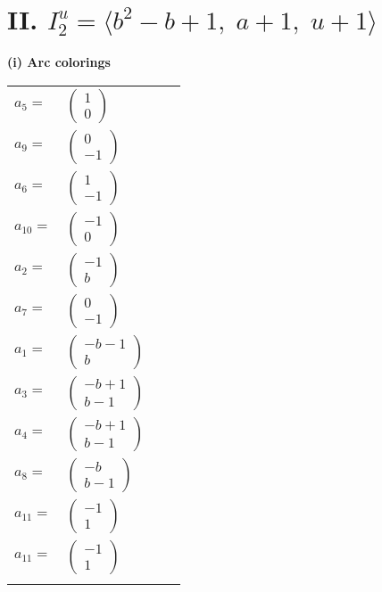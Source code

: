 \documentclass[1p]{elsarticle_modified}
\theoremstyle{definition}
\begin{document}
\centering \section*{II. $I^u_{2}= \langle b^2- b+1,\;a+1,\;u+1 \rangle$}
\flushleft \textbf{(i) Arc colorings}\\
\begin{tabular}{m{7pt} m{180pt} m{7pt} m{180pt} }
\flushright $a_{5}=$&$\begin{pmatrix}1\\0\end{pmatrix}$ \\
\flushright $a_{9}=$&$\begin{pmatrix}0\\-1\end{pmatrix}$ \\
\flushright $a_{6}=$&$\begin{pmatrix}1\\-1\end{pmatrix}$ \\
\flushright $a_{10}=$&$\begin{pmatrix}-1\\0\end{pmatrix}$ \\
\flushright $a_{2}=$&$\begin{pmatrix}-1\\b\end{pmatrix}$ \\
\flushright $a_{7}=$&$\begin{pmatrix}0\\-1\end{pmatrix}$ \\
\flushright $a_{1}=$&$\begin{pmatrix}- b-1\\b\end{pmatrix}$ \\
\flushright $a_{3}=$&$\begin{pmatrix}- b+1\\b-1\end{pmatrix}$ \\
\flushright $a_{4}=$&$\begin{pmatrix}- b+1\\b-1\end{pmatrix}$ \\
\flushright $a_{8}=$&$\begin{pmatrix}- b\\b-1\end{pmatrix}$ \\
\flushright $a_{11}=$&$\begin{pmatrix}-1\\1\end{pmatrix}$\\ \flushright $a_{11}=$&$\begin{pmatrix}-1\\1\end{pmatrix}$\\&\end{tabular}
\end{document}
